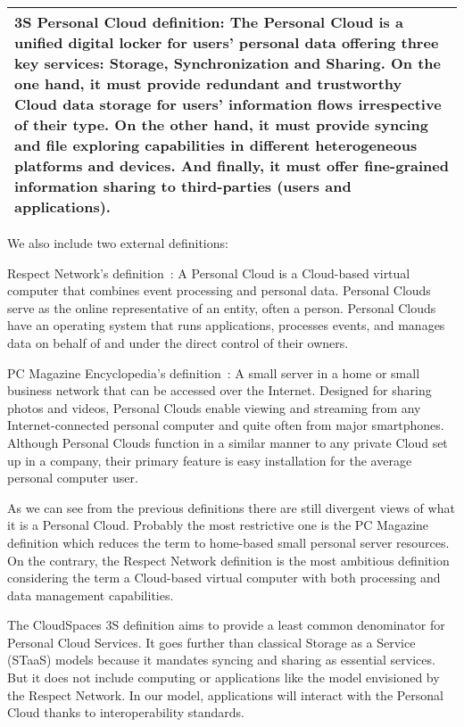 {

\noindent\noindent\begin{tabularx}{\textwidth}{|m{}|}
\hline %
 \rowcolor[gray]{.8}
\textbf{3S Personal Cloud definition:} The Personal Cloud is a unified digital  locker for users' personal data offering three key services: Storage, Synchronization and Sharing.  On the one hand, it must provide redundant and trustworthy Cloud data storage for users' information flows irrespective of their type. On the other hand, it must provide syncing and file exploring capabilities in different heterogeneous platforms and devices. And finally, it must offer fine-grained information sharing to third-parties (users and applications).\\ \hline
\end{tabularx}


\bigskip
We also include two external definitions:

Respect Network's definition~\cite{respectnetwork}: A Personal Cloud is a Cloud-based virtual computer that combines event processing and personal data. Personal Clouds serve as the online representative of an entity, often a person. Personal Clouds have an operating system that runs applications, processes events, and manages data on behalf of and under the direct control of their owners. 


PC Magazine Encyclopedia's definition~\cite{pcmag}: A small server in a home or small business network that can be accessed over the Internet. Designed for sharing photos and videos, Personal Clouds enable viewing and streaming from any Internet-connected personal computer and quite often from major smartphones. Although Personal Clouds function in a similar manner to any private Cloud set up in a company, their primary feature is easy installation for the average personal computer user.

As we can see from the previous definitions there are still divergent views of what it is a Personal Cloud. Probably the most restrictive one is the PC Magazine definition which reduces the term to home-based small personal server resources.  On the contrary, the Respect Network definition is the most ambitious definition considering the term a Cloud-based virtual computer with both processing and data management capabilities. 

The CloudSpaces 3S definition aims to provide a least common denominator for Personal Cloud Services. It goes further than classical Storage as a Service (STaaS) models because it mandates syncing and sharing as essential services. But it does not include computing or applications like the model envisioned by the Respect Network. In our model, applications will interact with the Personal Cloud thanks to interoperability standards.


}
